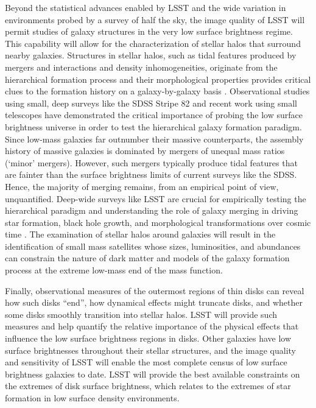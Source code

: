 {Beyond the statistical advances enabled by LSST and the
wide variation in environments probed by a survey
of half the sky, the image quality of LSST will permit
studies of galaxy structures in the very low surface
brightness regime. This capability
will allow for the characterization of stellar halos that
surround nearby galaxies. Structures in stellar halos,
such as tidal features produced by mergers and interactions and density inhomogeneities, originate
from the hierarchical formation process and their
morphological properties provides critical clues to the formation history
on a galaxy-by-galaxy basis \citep{bullock2005a,johnston2008a}.
Observational studies using small, deep surveys like the SDSS Stripe 82 \citep[e.g.][]{kaviraj2014a,kaviraj2014b} and recent work using small telescopes \citep{martinez-delgado2008a,atkinson2013,abraham2014a,van_dokkum2014a}
have 
demonstrated the critical importance of probing the low surface brightness universe 
in order to test the hierarchical galaxy formation paradigm. 
Since low-mass galaxies far outnumber their massive counterparts, the assembly history of massive galaxies is dominated by mergers of unequal mass ratios (`minor' mergers). 
However, such mergers typically produce tidal features that are fainter 
than the surface brightness limits of current surveys like the SDSS. 
Hence, the majority of merging remains, from an empirical point of view, unquantified. 
Deep-wide surveys like LSST are crucial for empirically testing the hierarchical paradigm 
and understanding the role of galaxy merging in driving star formation, black hole growth, and morphological transformations over cosmic time \citep{kaviraj2014b}. 
The examination of stellar halos around galaxies will
result in the identification of small mass satellites
whose sizes, luminosities, and abundances can constrain
the nature of dark matter and models of the galaxy formation process at the extreme
low-mass end of the mass function.  

Finally, observational measures of the outermost regions of thin disks can reveal
how such disks ``end'', how dynamical effects might truncate 
disks, and whether some disks smoothly transition into stellar
halos. LSST will provide such measures and  help quantify the
relative importance of the physical effects that influence the
low surface brightness regions in disks. Other galaxies
have low surface brightnesses throughout their stellar 
structures, and the image quality and sensitivity 
of LSST will enable the most complete census
of low surface brightness galaxies to date. LSST will provide
the best available constraints on the extremes of disk
surface brightness, which relates to the extremes of
star formation in low surface density environments.



}
